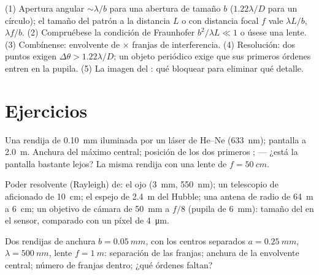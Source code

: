 \begin{method}\label{met:b2:diffraction:method}
(1) Apertura angular $\sim\lambda/b$ para una abertura de tamaño $b$ ($1.22\lambda/D$ para
un círculo); el tamaño del patrón a la distancia $L$ o con distancia focal $f$ vale
$\lambda L/b$, $\lambda f/b$. (2) Compruébese la condición de Fraunhofer $b^2/\lambda L \ll 1$ o
úsese una lente. (3) Combínense: envolvente de  $\times$ franjas de
interferencia. (4) Resolución: dos puntos exigen $\Delta\theta > 1.22\lambda/D$; un objeto
periódico exige que sus primeros órdenes entren en la pupila. (5) La imagen del
: qué bloquear para eliminar qué detalle.
\end{method}

\section{Ejercicios}

\begin{exercise}[$\star$]\label{exo:b2:diffraction:1}
Una rendija de \qty{0.10}{mm} iluminada por un láser de He--Ne (\qty{633}{nm}); pantalla a
\qty{2.0}{m}. Anchura del máximo central; posición de los dos primeros
;  --- ¿está la pantalla bastante lejos? La misma
rendija con una lente de $f = \qty{50}{cm}$.
\end{exercise}

\begin{exercise}[$\star$]\label{exo:b2:diffraction:2}
Poder resolvente (Rayleigh) de: el ojo (\qty{3}{mm}, \qty{550}{nm}); un
telescopio de aficionado de \qty{10}{cm}; el espejo de \qty{2.4}{m} del Hubble; una antena
de radio de \qty{64}{m} a \qty{6}{cm}; un objetivo de cámara de \qty{50}{mm} a $f/8$ (pupila de \qty{6}{mm}):
tamaño del  en el sensor, comparado con un píxel de \qty{4}{\micro m}.
\end{exercise}

\begin{exercise}[$\star$]\label{exo:b2:diffraction:3}
Dos rendijas de anchura $b = \qty{0.05}{mm}$, con los centros separados $a = \qty{0.25}{mm}$, $\lambda =
\qty{500}{nm}$, lente $f = \qty{1}{m}$: separación de las franjas; anchura de la envolvente
central; número de franjas dentro; ¿qué órdenes faltan?
\end{exercise}

